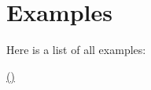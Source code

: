 \section{Examples}
Here is a list of all examples\+:\begin{DoxyCompactItemize}
\item 
\hyperlink{example_test_8cpp-example}{()}
\end{DoxyCompactItemize}
